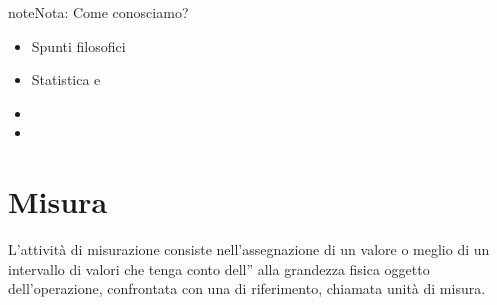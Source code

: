 \documentclass[letterpaper,10pt,italian]{jupyterBook}
\begin{document}
\begin{sphinxadmonition}{note}{Nota:}
\sphinxAtStartPar
Come conosciamo?
\begin{itemize}
\item {} 
\sphinxAtStartPar
Spunti filosofici

\item {} 
\sphinxAtStartPar
Statistica e 

\end{itemize}
\end{sphinxadmonition}

\sphinxAtStartPar
{}
\begin{itemize}
\item {} 
\sphinxAtStartPar
{}

\item {} 
\sphinxAtStartPar
{}

\end{itemize}

\sphinxstepscope


\chapter{Misura}
\label{\detokenize{ch/intro/measurements:misura}}\label{\detokenize{ch/intro/measurements:physics-hs-intro-measurements}}\label{\detokenize{ch/intro/measurements::doc}}
\sphinxAtStartPar
L’attività di misurazione consiste nell’assegnazione di un valore \sphinxhyphen{} o meglio di un intervallo di valori che tenga conto dell” \sphinxhyphen{} alla grandezza fisica oggetto dell’operazione, confrontata con una {\hyperref[\detokenize{ch/intro/measurements:physics-hs-intro-measurements-homogeneous}]{}} di riferimento, chiamata unità di misura.
\end{document}
